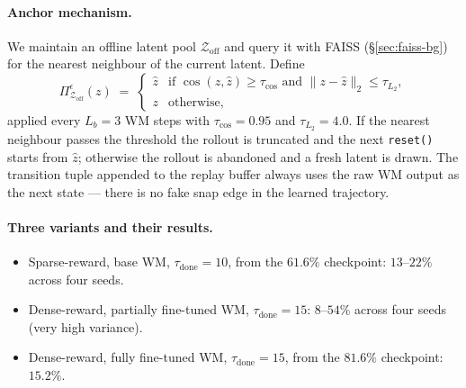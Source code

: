\paragraph{Anchor mechanism.}
We maintain an offline latent pool $\mathcal{Z}_{\text{off}}$ and query
it with FAISS (\S\ref{sec:faiss-bg}) for the nearest neighbour of the
current latent. Define
\begin{equation}
    \Pi^{\epsilon}_{\mathcal{Z}_{\text{off}}}(z) \;=\;
    \begin{cases}
        \hat z & \text{if } \cos(z,\hat z)\ge \tau_{\cos}
        \text{ and } \|z-\hat z\|_2 \le \tau_{L_2},\\
        z & \text{otherwise,}
    \end{cases}
    \label{eq:owm-anchor-proj}
\end{equation}
applied every $L_b = 3$ WM steps with $\tau_{\cos} = 0.95$ and
$\tau_{L_2} = 4.0$. If the nearest neighbour passes the threshold the
rollout is truncated and the next \texttt{reset()} starts from $\hat z$;
otherwise the rollout is abandoned and a fresh latent is drawn. The
transition tuple appended to the replay buffer always uses the raw WM
output as the next state --- there is no fake snap edge in the learned
trajectory.

\paragraph{Three variants and their results.}
\begin{itemize}
    \item Sparse-reward, base WM, $\tau_{\text{done}}=10$, from the
    $61.6\%$ checkpoint: $13$--$22\%$ across four seeds.
    \item Dense-reward, partially fine-tuned WM, $\tau_{\text{done}}=15$:
    $8$--$54\%$ across four seeds (very high variance).
    \item Dense-reward, fully fine-tuned WM, $\tau_{\text{done}}=15$,
    from the $81.6\%$ checkpoint: $15.2\%$.
\end{itemize}

